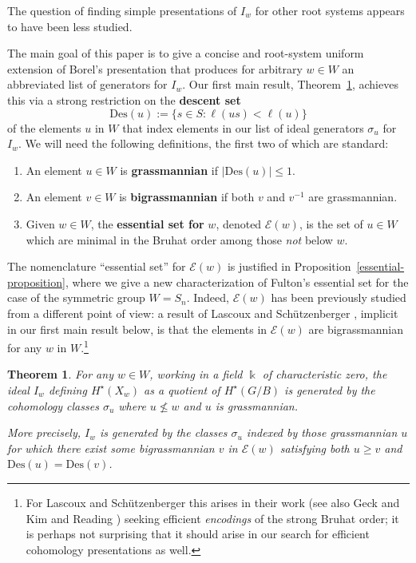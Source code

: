 \documentclass[12pt,dvips]{amsart}
\theoremstyle{plain}
\newtheorem{theorem}{Theorem}[section]
\theoremstyle{definition}
\theoremstyle{remark}
\numberwithin{equation}{section}
\def\Ess{{\mathcal{E}}}
\def\Des{\mathrm{Des}}
\begin{document}
The question of finding 
simple presentations of $I_w$ for other root systems appears to 
have been less studied.

The main goal of this paper is to give a concise and root-system
uniform extension of Borel's presentation that produces for arbitrary
$w\in W$ an abbreviated list of generators for $I_w$.  Our first main
result, Theorem~\ref{general-bound}, achieves this via a strong
restriction on the {\bf descent set}
$$
\Des(u):=\{ s \in S: \ell(us) < \ell(u) \}
$$ of the elements $u$ in $W$ that index elements in our list of ideal
generators $\sigma_u$ for $I_w$.  We will need the following
definitions, the first two of which are standard:
\begin{enumerate}
\item[$\bullet$]
An element $u\in W$ is {\bf grassmannian} if $|\Des(u)| \leq 1$.
\item[$\bullet$]
An element $v \in W$ is {\bf bigrassmannian} if both $v$ and $v^{-1}$ are grassmannian.  
\item[$\bullet$]
Given $w \in W$, the {\bf essential set for} $w$, denoted
$\Ess(w)$, is the set of $u\in W$ which are minimal in the Bruhat order among those
{\it not} below $w$.
\end{enumerate}
The nomenclature ``essential set'' for $\Ess(w)$ is justified in
Proposition~\ref{essential-proposition}, where we give a new
characterization of Fulton's essential set \cite{Fulton} for the case
of the symmetric group $W=S_n$.  Indeed, $\Ess(w)$ has been
previously studied from a different point of view: a result of Lascoux
and Sch\"utzenberger \cite[Th\'eor\`eme 3.6]{LascouxSchutzenberger},
implicit in
our first main result below, is that the elements in
$\Ess(w)$ are bigrassmannian for any $w$ in $W$.\footnote{ For Lascoux
and Sch\"utzenberger this arises in their work (see also Geck and Kim
\cite{GeckKim} and Reading \cite{Reading}) seeking efficient {\it
encodings} of the strong Bruhat order; it is perhaps not surprising that
it should arise in our search for efficient cohomology presentations
as well.}

\begin{theorem}
\label{general-bound}
For any $w\in W$, working in a field $\Bbbk$ of characteristic zero,
the ideal $I_w$ defining $H^\star(X_w)$ as a quotient of $H^\star(G/B)$ is
generated by the cohomology classes $\sigma_u$ where $u \not\leq w$
and $u$ is grassmannian.

More precisely, $I_w$ is generated by the classes $\sigma_u$ indexed
by those grassmannian $u$ for which there exist some bigrassmannian
$v$ in $\Ess(w)$ satisfying both $u \geq v$ and $\Des(u) = \Des(v)$.
\end{theorem}
\end{document}
